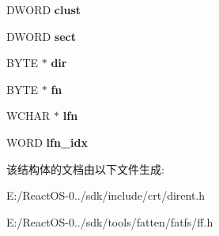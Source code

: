 \begin{DoxyCompactItemize}
D\+W\+O\+RD {\bfseries clust}
\item 
\mbox{\label{struct_d_i_r_ad01fcc812ed0dad11a593574336adc9e}} 
D\+W\+O\+RD {\bfseries sect}
\item 
\mbox{\label{struct_d_i_r_a6c2a8c0cf2d55ae99775e93a16593449}} 
B\+Y\+TE $\ast$ {\bfseries dir}
\item 
\mbox{\label{struct_d_i_r_a32da2f31d6c3b6c42eef981cb0cfd2ee}} 
B\+Y\+TE $\ast$ {\bfseries fn}
\item 
\mbox{\label{struct_d_i_r_af62fd789383e6f1397f74617e11c135d}} 
W\+C\+H\+AR $\ast$ {\bfseries lfn}
\item 
\mbox{\label{struct_d_i_r_acad41b18758c9278c14d47076e8149fc}} 
W\+O\+RD {\bfseries lfn\+\_\+idx}
\end{DoxyCompactItemize}


该结构体的文档由以下文件生成\+:\begin{DoxyCompactItemize}
\item 
E\+:/\+React\+O\+S-\/0../sdk/include/crt/dirent.\+h\item 
E\+:/\+React\+O\+S-\/0../sdk/tools/fatten/fatfs/ff.\+h\end{DoxyCompactItemize}

